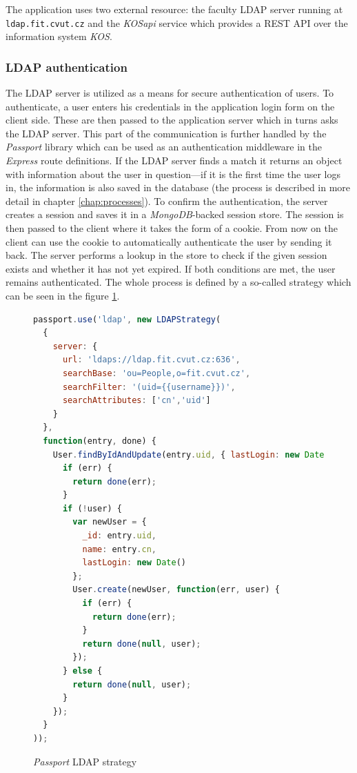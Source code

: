 \documentclass[thesis=M,english,hidelinks]{FITthesis}[2012/10/20]
\newcommand{\code}{\texttt}
\begin{document}
The application uses two external resource: the faculty LDAP server running at \code{ldap.fit.cvut.cz} and the \textit{KOSapi} service which provides a REST API over the information system \textit{KOS}.

      \subsubsection{LDAP authentication}

The LDAP server is utilized as a means for secure authentication of users. To authenticate, a user enters his credentials in the application login form on the client side. These are then passed to the application server which in turns asks the LDAP server. This part of the communication is further handled by the \textit{Passport} library \cite{passport} which can be used as an authentication middleware in the \textit{Express} route definitions. If the LDAP server finds a match it returns an object with information about the user in question---if it is the first time the user logs in, the information is also saved in the database (the process is described in more detail in chapter \ref{chap:processes}). To confirm the authentication, the server creates a session and saves it in a \textit{MongoDB}-backed session store. The session is then passed to the client where it takes the form of a cookie. From now on the client can use the cookie to automatically authenticate the user by sending it back. The server performs a lookup in the store to check if the given session exists and whether it has not yet expired. If both conditions are met, the user remains authenticated. The whole process is defined by a so-called strategy which can be seen in the figure \ref{fig:passport_strategy}.

\begin{figure}
  \begin{lstlisting}[language=JavaScript]
passport.use('ldap', new LDAPStrategy(
  {
    server: {
      url: 'ldaps://ldap.fit.cvut.cz:636',
      searchBase: 'ou=People,o=fit.cvut.cz',
      searchFilter: '(uid={{username}})',
      searchAttributes: ['cn','uid']
    }
  },
  function(entry, done) {
    User.findByIdAndUpdate(entry.uid, { lastLogin: new Date() }, function(err, user) {
      if (err) {
        return done(err);
      }
      if (!user) {
        var newUser = {
          _id: entry.uid,
          name: entry.cn,
          lastLogin: new Date()
        };
        User.create(newUser, function(err, user) {
          if (err) {
            return done(err);
          }
          return done(null, user);
        });
      } else {
        return done(null, user);
      }
    });
  }
));
  \end{lstlisting}
  \caption{\textit{Passport} LDAP strategy}
  \label{fig:passport_strategy}
\end{figure}
\end{document}

